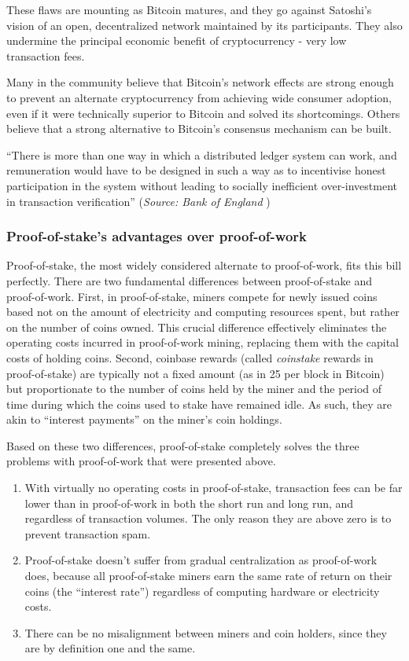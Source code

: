 \documentclass[a4paper,11pt]{article}
\begin{document}
These flaws are mounting as Bitcoin matures, and they go against Satoshi's vision of an open, decentralized network maintained by its participants. They also undermine the principal economic benefit of cryptocurrency - very low transaction fees. 



Many in the community believe that Bitcoin's network effects are strong enough to prevent an alternate cryptocurrency from achieving wide consumer adoption, even if it were technically superior to Bitcoin and solved its shortcomings. Others believe that a strong alternative to Bitcoin's consensus mechanism can be built. 

``There is more than one way in which a distributed ledger system can work, and remuneration would have to be designed in such a way as to incentivise honest participation in the system without leading to socially inefficient over-investment in transaction verification'' (\textit{Source: Bank of England} \cite[p31.]{bank})

\subsubsection*{Proof-of-stake's advantages over proof-of-work}

Proof-of-stake, the most widely considered alternate to proof-of-work, fits this bill perfectly. There are two fundamental differences between proof-of-stake and proof-of-work. 
First, in proof-of-stake, miners compete for newly issued coins based not on the amount of electricity and computing resources spent, but rather on the number of coins owned. This crucial difference effectively eliminates the operating costs incurred in proof-of-work mining, replacing them with the capital costs of holding coins.
Second, coinbase rewards (called \textit{\textit{coinstake}} rewards in proof-of-stake) are typically not a fixed amount (as in 25 per block in Bitcoin) but proportionate to the number of coins held by the miner and the period of time during which the coins used to stake have remained idle. As such, they are akin to ``interest payments'' on the miner's coin holdings.



Based on these two differences, proof-of-stake completely solves the three problems with proof-of-work that were presented above.
\begin{enumerate}
\setlength{\itemsep}{0pt}
\item{With virtually no operating costs in proof-of-stake, transaction fees can be far lower than in proof-of-work in both the short run and long run, and regardless of transaction volumes. The only reason they are above zero is to prevent transaction spam.}
\item{Proof-of-stake doesn't suffer from gradual centralization as proof-of-work does, because all proof-of-stake miners earn the same rate of return on their coins (the ``interest rate'') regardless of computing hardware or electricity costs.
}
\item{There can be no misalignment between miners and coin holders, since they are by definition one and the same.}
\end{enumerate}
\end{document}

